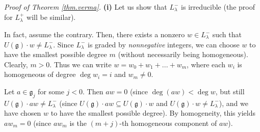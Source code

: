 \documentclass[etingof-lie.tex]{subfiles}
\begin{document}
\textit{Proof of Theorem \ref{thm.verma}.} \textbf{(i)} Let us show that
$L_{\lambda}^{-}$ is irreducible (the proof for $L_{\lambda}^{+}$ will be similar).

In fact, assume the contrary. Then, there exists a nonzero $w\in L_{\lambda
}^{-}$ such that $U\left(  \mathfrak{g}\right)  \cdot w\neq L_{\lambda}^{-}$.
Since $L_{\lambda}^{-}$ is graded by \textit{nonnegative} integers, we can
choose $w$ to have the smallest possible degree $m$ (without necessarily being
homogeneous). Clearly, $m>0$. Thus we can write $w=w_{0}+w_{1}+...+w_{m}$,
where each $w_{i}$ is homogeneous of degree $\deg w_{i}=i$ and $w_{m}\neq0$.

Let $a\in\mathfrak{g}_{j}$ for some $j<0$. Then $aw=0$ (since $\deg\left(
aw\right)  <\deg w$, but still $U\left(  \mathfrak{g}\right)  \cdot aw\neq
L_{\lambda}^{-}$ (since $U\left(  \mathfrak{g}\right)  \cdot aw\subseteq
U\left(  \mathfrak{g}\right)  \cdot w$ and $U\left(  \mathfrak{g}\right)
\cdot w\neq L_{\lambda}^{-}$), and we have chosen $w$ to have the smallest
possible degree). By homogeneity, this yields $aw_{m}=0$ (since $aw_{m}$ is
the $\left(  m+j\right)  $-th homogeneous component of $aw$).
\end{document}
